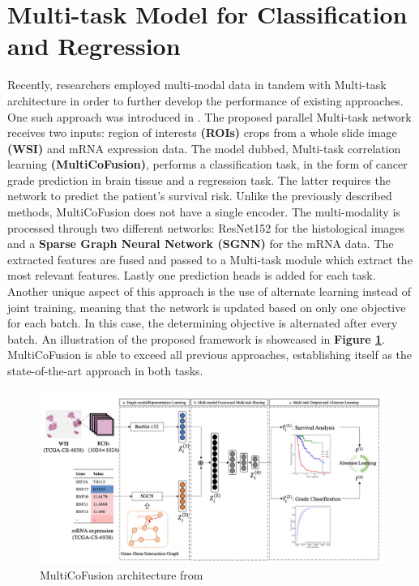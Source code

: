 \section{Multi-task Model for Classification and Regression}
\label{classification_reg_mt}
Recently, researchers employed multi-modal data in tandem with Multi-task architecture in order to further develop the performance of existing approaches. One such approach was introduced in \cite{tan2022multi}. The proposed parallel Multi-task network receives two inputs: region of interests \textbf{(ROIs)} crops from a whole slide image \textbf{(WSI)} and mRNA expression data. The model dubbed, Multi-task
correlation learning \textbf{(MultiCoFusion)}, performs a classification task, in the form of cancer grade prediction in brain tissue and a regression task. The latter requires the network to predict the patient's survival risk. Unlike the previously described methods, MultiCoFusion does not have a single encoder. The multi-modality is processed through two different networks: ResNet152 for the histological images and a \textbf{Sparse Graph Neural Network (SGNN)} \cite{tan2021hierarchical} for the mRNA data. The extracted features are fused and passed to a Multi-task module which extract the most relevant features. Lastly one prediction heads is added for each task. Another unique aspect of this approach is the use of alternate learning instead of joint training, meaning that the network is updated based on only one objective for each batch. In this case, the determining objective is alternated after every batch.  An illustration of the proposed framework is showcased in \textbf{Figure \ref{multimodal_multitask2}}. MultiCoFusion is able to exceed all previous approaches, establishing itself as the state-of-the-art approach in both tasks.

\begin{figure}[htb]
    \centering
	\centerline{\includegraphics[scale=0.8]{figures/multimodal_multitask2.png}}
	\caption{MultiCoFusion architecture from \cite{tan2022multi}}
	\label{multimodal_multitask2}
\end{figure}


